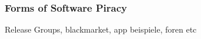 \subsubsection{Forms of Software Piracy} \label{subsection:piracy-overview-forms}
Release Groups, blackmarket, app beispiele, foren etc\newline
